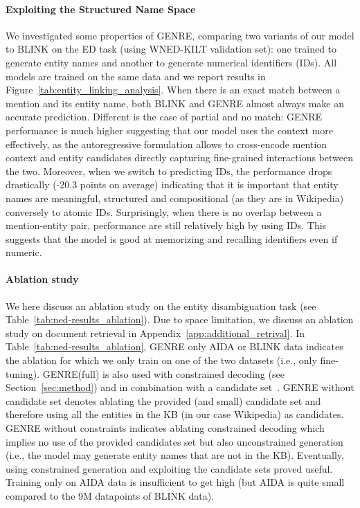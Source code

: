 \documentclass{article} \usepackage{main,times}
\makeatletter
\def\genre{\textsc{GENRE}\@\xspace}
\makeatother
\begin{document}
\paragraph{Exploiting the Structured Name Space} 
We investigated some properties of \genre, comparing two variants of our model to BLINK on the ED task (using WNED-KILT validation set): one trained to generate entity names and another to generate numerical identifiers (IDs).
All models are trained on the same data and we report results in Figure~\ref{tab:entity_linking_analysis}.
When there is an exact match between a mention and its entity name, both BLINK and \genre almost always make an accurate prediction. Different is the case of partial and no match: \genre performance is much higher suggesting that our model 
uses the context more effectively,
as the autoregressive formulation allows to cross-encode mention context and entity candidates directly capturing fine-grained interactions between the two.
Moreover, when we switch to predicting IDs, the performance drops drastically (-20.3 points on average) indicating that it is important that entity names are meaningful, structured and compositional (as they are in Wikipedia)
conversely to atomic IDs. Surprisingly, when there is no overlap between a mention-entity pair, performance are still relatively high by using IDs.
This suggests that the model is good at memorizing and recalling identifiers even if numeric.

\paragraph{Ablation study}
We here discuss an ablation study on the entity disambiguation task (see Table~\ref{tab:ned-results_ablation}). Due to space limitation, we discuss an ablation study on document retrieval in Appendix~\ref{app:additional_retrival}.
In Table~\ref{tab:ned-results_ablation}, \genre only AIDA or BLINK data indicates the ablation for which we only train on one of the two datasets (i.e., only fine-tuning). \genre (full) is also used with constrained decoding (see Section~\ref{sec:method}) and in combination with a candidate set~\citep[as provided by][]{le-titov-2018-improving}. \genre without candidate set denotes ablating the provided (and small) candidate set and therefore using all the entities in the KB (in our case Wikipedia) as candidates. \genre without constraints indicates ablating constrained decoding which implies no use of the provided candidates set but also unconstrained generation (i.e., the model may generate entity names that are not in the KB). Eventually, using constrained generation and exploiting the candidate sets proved useful. Training only on AIDA data is insufficient to get high  (but AIDA is quite small compared to the 9M datapoints of BLINK data).
\end{document}
